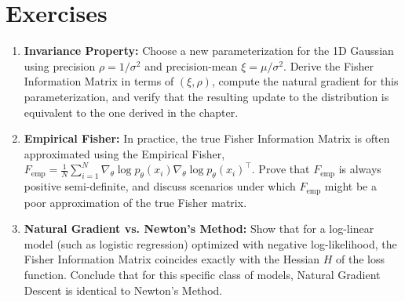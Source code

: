 \section{Exercises}
\begin{enumerate}
    \item \textbf{Invariance Property:} Choose a new parameterization for the 1D Gaussian using precision $\rho = 1/\sigma^2$ and precision-mean $\xi = \mu/\sigma^2$. Derive the Fisher Information Matrix in terms of $(\xi, \rho)$, compute the natural gradient for this parameterization, and verify that the resulting update to the distribution is equivalent to the one derived in the chapter.
    \item \textbf{Empirical Fisher:} In practice, the true Fisher Information Matrix is often approximated using the Empirical Fisher, $F_{\text{emp}} = \frac{1}{N} \sum_{i=1}^N \nabla_\theta \log p_\theta(x_i) \nabla_\theta \log p_\theta(x_i)^\top$. Prove that $F_{\text{emp}}$ is always positive semi-definite, and discuss scenarios under which $F_{\text{emp}}$ might be a poor approximation of the true Fisher matrix.
    \item \textbf{Natural Gradient vs. Newton's Method:} Show that for a log-linear model (such as logistic regression) optimized with negative log-likelihood, the Fisher Information Matrix coincides exactly with the Hessian $H$ of the loss function. Conclude that for this specific class of models, Natural Gradient Descent is identical to Newton's Method.
\end{enumerate}

